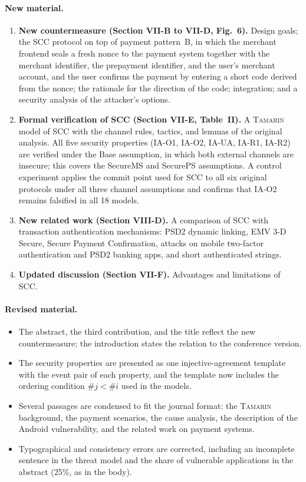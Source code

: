 \documentclass[11pt]{article}
\begin{document}
\paragraph{New material.}
\begin{enumerate}
  \item \textbf{New countermeasure (Section VII-B to VII-D, Fig.~6).}
  Design goals; the SCC protocol on top of payment pattern~B, in which the merchant frontend seals a fresh nonce to the payment system together with the merchant identifier, the prepayment identifier, and the user's merchant account, and the user confirms the payment by entering a short code derived from the nonce; the rationale for the direction of the code; integration; and a security analysis of the attacker's options.
  \item \textbf{Formal verification of SCC (Section VII-E, Table~II).}
  A \textsc{Tamarin} model of SCC with the channel rules, tactics, and lemmas of the original analysis.
  All five security properties (IA-O1, IA-O2, IA-UA, IA-R1, IA-R2) are verified under the Base assumption, in which both external channels are insecure; this covers the SecureMS and SecurePS assumptions.
  A control experiment applies the commit point used for SCC to all six original protocols under all three channel assumptions and confirms that IA-O2 remains falsified in all 18 models.
  \item \textbf{New related work (Section VIII-D).}
  A comparison of SCC with transaction authentication mechanisms: PSD2 dynamic linking, EMV 3-D Secure, Secure Payment Confirmation, attacks on mobile two-factor authentication and PSD2 banking apps, and short authenticated strings.
  \item \textbf{Updated discussion (Section VII-F).}
  Advantages and limitations of SCC.
\end{enumerate}

\paragraph{Revised material.}
\begin{itemize}
  \item The abstract, the third contribution, and the title reflect the new countermeasure; the introduction states the relation to the conference version.
  \item The security properties are presented as one injective-agreement template with the event pair of each property, and the template now includes the ordering condition $\#j < \#i$ used in the models.
  \item Several passages are condensed to fit the journal format: the \textsc{Tamarin} background, the payment scenarios, the cause analysis, the description of the Android vulnerability, and the related work on payment systems.
  \item Typographical and consistency errors are corrected, including an incomplete sentence in the threat model and the share of vulnerable applications in the abstract (25\%, as in the body).
\end{itemize}
\end{document}
